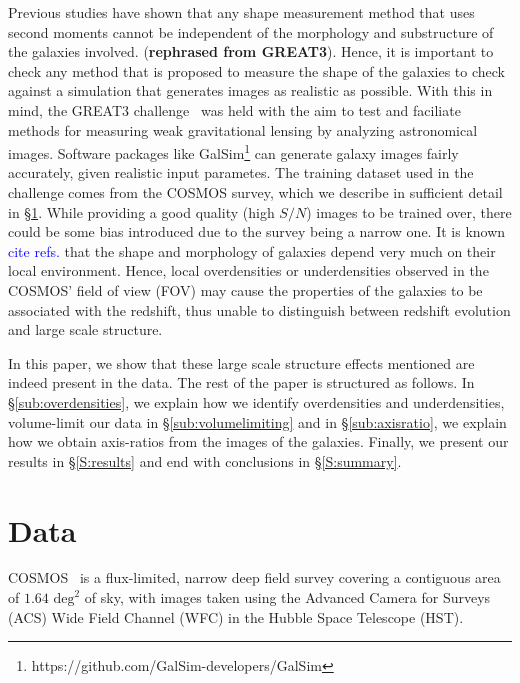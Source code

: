 \documentclass[twocolumn,useAMS,usenatbib]{mn2e}
\newcommand{\arun}[1]{{\textcolor{blue}{#1}}}
\begin{document}
Previous studies have shown that any shape measurement method that uses second moments cannot be independent of the morphology and substructure of the galaxies involved. ({\bf rephrased from GREAT3}).
Hence, it is important to check any method that is proposed to measure the shape of the galaxies to check against a simulation that generates images as realistic as possible.  
With this in mind, the GREAT3 challenge~\citep{great3} was held with the aim to test and faciliate methods for measuring weak gravitational lensing by analyzing astronomical images.
Software packages like GalSim\footnote{https://github.com/GalSim-developers/GalSim} can generate galaxy images fairly accurately, given realistic input parametes.
The training dataset used in the challenge comes from the COSMOS survey, which we describe in sufficient detail in \S\ref{S:data}.
While providing a good quality (high $S/N$) images to be trained over, there could be some bias introduced due to the survey being a narrow one.
It is known \arun{cite refs.} that the shape and morphology of galaxies depend very much on their local environment. Hence, local overdensities or underdensities
observed in the COSMOS' field of view (FOV) may cause the properties of the galaxies to be associated with the redshift, thus unable to distinguish between redshift evolution and large scale structure.

In this paper, we show that these large scale structure effects mentioned are indeed present in the data. The rest of the paper is structured as follows.
In \S\ref{sub:overdensities}, we explain how we identify overdensities and underdensities, volume-limit our data in \S\ref{sub:volumelimiting} and in \S\ref{sub:axisratio},
 we explain how we obtain axis-ratios from the images of the galaxies. Finally, we present our results in \S\ref{S:results} and end with conclusions in \S\ref{S:summary}.
\section{Data}
\label{S:data}
COSMOS~\citep{COSMOS_overview, COSMOS_generic, COSMOS_Alexie} is a flux-limited, narrow deep field survey covering a contiguous area of $1.64 \text{ deg}^2$ of sky, with images taken using the Advanced Camera for Surveys (ACS) Wide Field Channel (WFC)
in the Hubble Space Telescope (HST). 
\end{document}
